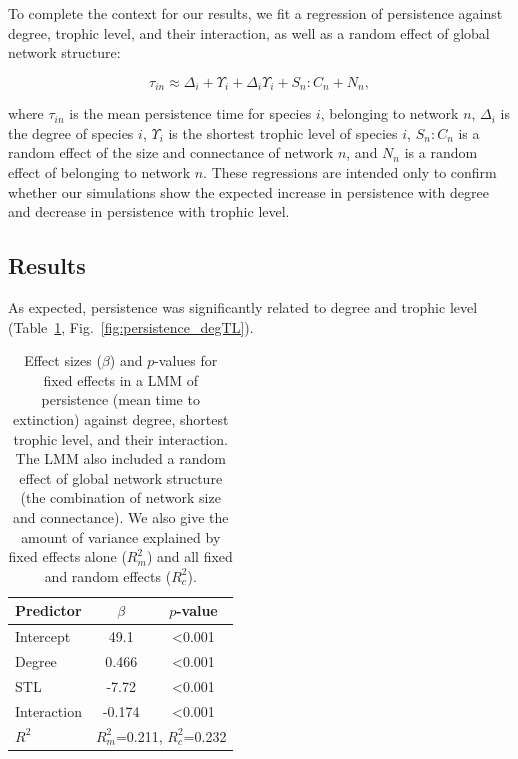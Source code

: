\documentclass[12pt]{article}
\begin{document}
\begin{spacing}{2.0}
            To complete the context for our results, we fit a regression of persistence against degree, trophic level, and their interaction, as well as a random effect of global network structure:
            
            \begin{equation}
                \tau_{in} \approx \Delta_{i} + \Upsilon_{i} + \Delta_{i}\Upsilon_{i} + S_{n}:C_{n} + N_n ,
                \label{eq:persistence_degTL}
            \end{equation}
            
            where $\tau_{in}$ is the mean persistence time for species $i$, belonging to network $n$, $\Delta_i$ is the degree of species $i$, $\Upsilon_i$ is the shortest trophic level of species $i$, $S_{n}:C_{n}$ is a random effect of the size and connectance of network $n$, and $N_n$ is a random effect of belonging to network $n$.
            These regressions are intended only to confirm whether our simulations show the expected increase in persistence with degree and decrease in persistence with trophic level.

	\subsection*{Results}

		As expected, persistence was significantly related to degree and trophic level (Table~\ref{tab:per_degTL}, Fig.~\ref{fig:persistence_degTL}).


		\begin{table}[h!]
			\caption{Effect sizes ($\beta$) and $p$-values for fixed effects in a LMM of persistence (mean time to extinction) against degree, shortest trophic level, and their interaction. The LMM also included a random effect of global network structure (the combination of network size and connectance). We also give the amount of variance explained by fixed effects alone ($R^2_m$) and all fixed and random effects ($R^2_c$).}
			\label{tab:per_degTL}
			\begin{tabular}{l | c c |}
			Predictor & $\beta$ & $p$-value \\
			\hline
			Intercept & 49.1 & \textless0.001 \\
			Degree & 0.466 & \textless0.001 \\
			STL & -7.72 & \textless0.001 \\
			Interaction & -0.174 & \textless0.001 \\
			\hline
			$R^2$ & \multicolumn{2}{|c}{$R^2_m$=0.211, $R^2_c$=0.232} \\
			\end{tabular}
			\end{table}



\end{spacing}
\end{document}
